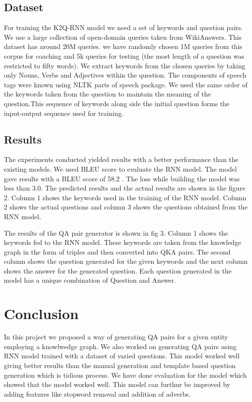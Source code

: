 \documentclass[conference]{IEEEtran}
\begin{document}
\subsection{Dataset}
For training the K2Q-RNN model we need a set of keywords and question pairs. We use a large collection of open-domain queries taken from WikiAnswers. This dataset has around 20M queries. we have randomly chosen
1M queries from this corpus for coaching and 5k queries for testing (the most length of a question was restricted to fifty words). We extract keywords from the chosen queries by taking only Nouns, Verbs and Adjectives within the question. The components of speech tags were known using NLTK parts of speech package. We used the same order of the keywords taken from the question to maintain the meaning of the question.This sequence of keywords along side the initial question forms the input-output sequence used for
training.


\subsection{Results}
The experiments conducted yielded results with a better performance than the existing models. We used BLEU score to evaluate the RNN model. The model gave results with a BLEU score of 58.2 . The loss while building the model was less than 3.0. The predicted results and the actual results are shown in the figure 2. Column 1 shows the keywords used in the training of the RNN model. Column 2 shows the actual questions and column 3 shows the questions obtained from the RNN model.

The results of the QA pair generator is shown in fig 3. Column 1 shows the keywords fed to the RNN model. These keywords are taken from the knowledge graph in the form of triples and then converted into QKA pairs.
The second column shows the question generated for the given keywords and the next column shows the answer for the generated question. Each question generated in the model has a unique combination of Question and Answer.
\section{Conclusion}
In this project we proposed a way of generating QA pairs for a given entity employing a knowlwedge graph.
We also worked on generating QA pairs using RNN model trained with a dataset of varied questions. This model worked well giving better results than the manual generation and template based question generation which is tidious process. We have done evaluation for the model which showed that the model worked well.
This model can furthur be improved by adding features like stopword removal and addition of adverbs.
\end{document}
